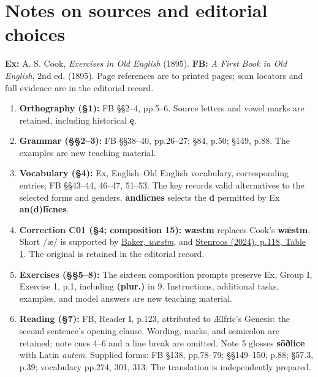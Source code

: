 \begingroup\small
\clearpage
{}
\section*{Notes on sources and editorial choices}


\textbf{Ex:} A. S. Cook, \textit{Exercises in Old English} (1895). \textbf{FB:} \textit{A First Book in Old English}, 2nd ed. (1895). Page references are to printed pages; scan locators and full evidence are in the editorial record.


\begin{enumerate}
\item[1.] \textbf{Orthography (§1):} FB §§2–4, pp.5–6. Source letters and vowel marks are retained, including historical \textbf{ę}.
\item[2.] \textbf{Grammar (§§2–3):} FB §§38–40, pp.26–27; §84, p.50; §149, p.88. The examples are new teaching material.
\item[3.] \textbf{Vocabulary (§4):} Ex, English–Old English vocabulary, corresponding entries; FB §§43–44, 46–47, 51–53. The key records valid alternatives to the selected forms and genders. \textbf{andlīcnes} selects the \textbf{d} permitted by Ex \textbf{an(d)līcnes}.
\item[4.] \textbf{Correction C01 (§4; composition 15):} \textbf{wæstm} replaces Cook's \textbf{wǣstm}. Short /æ/ is supported by \href{https://glossary.oldenglishaerobics.net/oeaginfo.php?objid=xwaestm\&objtype=gentry}{Baker, \textit{wæstm}}, and \href{https://doi.org/10.17811/selim.29.2024.109-25}{Stenroos (2024), p.118, Table 1}. The original is retained in the editorial record.
\item[5.] \textbf{Exercises (§§5–8):} The sixteen composition prompts preserve Ex, Group I, Exercise 1, p.1, including \textbf{(plur.)} in 9. Instructions, additional tasks, examples, and model answers are new teaching material.
\item[6.] \textbf{Reading (§7):} FB, Reader I, p.123, attributed to Ælfric's Genesis: the second sentence's opening clause. Wording, marks, and semicolon are retained; note cues 4–6 and a line break are omitted. Note 5 glosses \textbf{sōðlice} with Latin \textit{autem}. Supplied forms: FB §138, pp.78–79; §§149–150, p.88; §57.3, p.39; vocabulary pp.274, 301, 313. The translation is independently prepared.
\end{enumerate}



\endgroup

